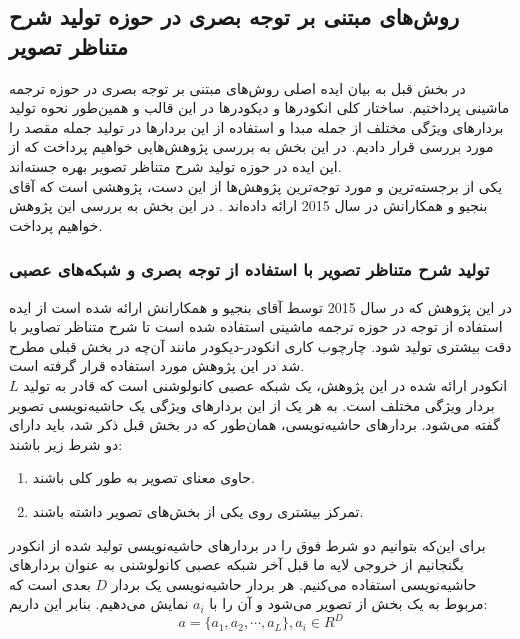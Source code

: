 \subsection{روش‌های مبتنی بر توجه بصری در حوزه تولید شرح متناظر تصویر}
در بخش قبل به بیان ایده اصلی روش‌های مبتنی بر توجه بصری در حوزه ترجمه ماشینی پرداختیم. ساختار کلی انکودرها و دیکودرها در این قالب و همین‌طور نحوه تولید بردارهای ویژگی مختلف از جمله مبدا و استفاده از این بردارها در تولید جمله مقصد را مورد بررسی قرار دادیم. در این بخش  به بررسی پژوهش‌هایی خواهیم پرداخت که از این ایده در حوزه تولید شرح متناظر تصویر بهره‌ جسته‌اند.
\\
یکی از برجسته‌ترین و مورد توجه‌ترین پژوهش‌ها از این دست، پژوهشی است که آقای بنجیو و همکارانش در سال 2015 ارائه داده‌اند
\cite{xu2015show}.
در این بخش به بررسی این پژوهش خواهیم پرداخت.

\subsubsection[تولید شرح متناظر تصویر با استفاده از توجه بصری و شبکه‌های عصبی]{تولید شرح متناظر تصویر با استفاده از توجه بصری و شبکه‌های عصبی \cite{xu2015show}}
	
در این پژوهش که در سال 2015 توسط آقای بنجیو و همکارانش ارائه شده است از ایده استفاده از توجه در حوزه ترجمه ماشینی استفاده شده است تا شرح متناظر تصاویر با دقت بیشتری تولید شود. چارچوب کاری انکودر-دیکودر مانند آن‌چه در بخش قبلی مطرح شد در این پژوهش مورد استفاده قرار گرفته است.
\\
انکودر ارائه شده در این پژوهش، یک شبکه عصبی کانولوشنی است که قادر به تولید $L$ بردار ویژگی مختلف است. به هر یک از این بردارهای ویژگی یک حاشیه‌نویسی تصویر گفته می‌شود. بردارهای حاشیه‌نویسی، همان‌طور که در بخش قبل ذکر شد، باید دارای دو شرط زیر باشند:
\begin{enumerate}
\item حاوی معنای تصویر به طور کلی باشند.
\item تمرکز بیشتری روی یکی از بخش‌های تصویر داشته باشند.
\end{enumerate}
برای این‌که بتوانیم دو شرط فوق را در بردارهای حاشیه‌نویسی تولید شده از انکودر بگنجانیم از خروجی لایه ما قبل آخر شبکه عصبی کانولوشنی به عنوان بردارهای حاشیه‌نویسی استفاده می‌کنیم. هر بردار حاشیه‌نویسی یک بردار $D$ بعدی است که مربوط به یک بخش از تصویر می‌شود و آن را با $a_i$ نمایش می‌دهیم. بنابر این داریم:
\begin{equation}
a = \{a_1, a_2, \cdots, a_L\}, a_i \in R^D
\end{equation}

